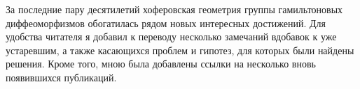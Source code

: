 За последние пару десятилетий хоферовская геометрия группы
гамильтоновых диффеоморфизмов обогатилась рядом новых интересных
достижений.
Для удобства читателя я добавил к переводу несколько замечаний
вдобавок к уже устаревшим, а также касающихся проблем и гипотез, для
которых были найдены решения. Кроме того, мною была добавлены ссылки на
несколько вновь появившихся публикаций.
